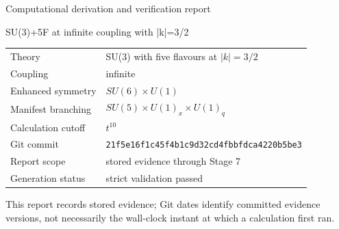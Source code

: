 \documentclass[11pt]{article}
\begin{document}
\begin{titlepage}\centering
{\LARGE Computational derivation and verification report\par}\vspace{1cm}
{\Large SU(3)+5F at infinite coupling with |k|=3/2\par}
\vfill\begin{tabular}{ll}
Theory & SU(3) with five flavours at $|k|=3/2$\\
Coupling & infinite\\
Enhanced symmetry & $SU(6)\times U(1)$\\
Manifest branching & $SU(5)\times U(1)_x\times U(1)_q$\\
Calculation cutoff & $t^{10}$\\
Git commit & \texttt{21f5e16f1c45f4b1c9d32cd4fbbfdca4220b5be3}\\
Report scope & stored evidence through Stage 7\\
Generation status & strict validation passed\\
\end{tabular}\vfill
This report records stored evidence; Git dates identify committed evidence versions, not necessarily the wall-clock instant at which a calculation first ran.
\end{titlepage}\tableofcontents\clearpage
\end{document}
